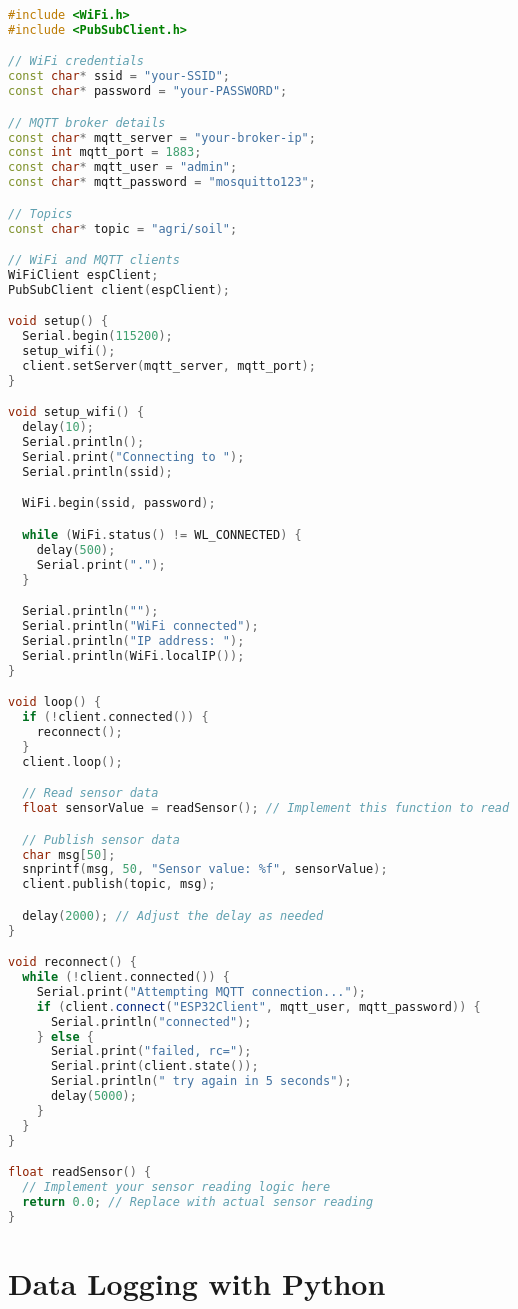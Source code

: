\documentclass{article}
\begin{document}
\begin{lstlisting}[language=C++]
#include <WiFi.h>
#include <PubSubClient.h>

// WiFi credentials
const char* ssid = "your-SSID";
const char* password = "your-PASSWORD";

// MQTT broker details
const char* mqtt_server = "your-broker-ip";
const int mqtt_port = 1883;
const char* mqtt_user = "admin";
const char* mqtt_password = "mosquitto123";

// Topics
const char* topic = "agri/soil";

// WiFi and MQTT clients
WiFiClient espClient;
PubSubClient client(espClient);

void setup() {
  Serial.begin(115200);
  setup_wifi();
  client.setServer(mqtt_server, mqtt_port);
}

void setup_wifi() {
  delay(10);
  Serial.println();
  Serial.print("Connecting to ");
  Serial.println(ssid);

  WiFi.begin(ssid, password);

  while (WiFi.status() != WL_CONNECTED) {
    delay(500);
    Serial.print(".");
  }

  Serial.println("");
  Serial.println("WiFi connected");
  Serial.println("IP address: ");
  Serial.println(WiFi.localIP());
}

void loop() {
  if (!client.connected()) {
    reconnect();
  }
  client.loop();

  // Read sensor data
  float sensorValue = readSensor(); // Implement this function to read from your sensor

  // Publish sensor data
  char msg[50];
  snprintf(msg, 50, "Sensor value: %f", sensorValue);
  client.publish(topic, msg);

  delay(2000); // Adjust the delay as needed
}

void reconnect() {
  while (!client.connected()) {
    Serial.print("Attempting MQTT connection...");
    if (client.connect("ESP32Client", mqtt_user, mqtt_password)) {
      Serial.println("connected");
    } else {
      Serial.print("failed, rc=");
      Serial.print(client.state());
      Serial.println(" try again in 5 seconds");
      delay(5000);
    }
  }
}

float readSensor() {
  // Implement your sensor reading logic here
  return 0.0; // Replace with actual sensor reading
}
\end{lstlisting}

\section{Data Logging with Python}
\end{document}
